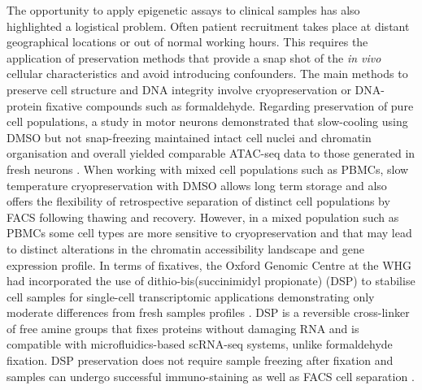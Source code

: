 The opportunity to apply epigenetic assays to clinical samples has also highlighted a logistical problem. Often patient recruitment takes place at distant geographical locations or out of normal working hours. This requires the application of preservation methods that provide a snap shot of the \textit{in vivo} cellular characteristics and avoid introducing confounders. The main methods to preserve cell structure and DNA integrity involve cryopreservation or DNA-protein fixative compounds such as formaldehyde. Regarding preservation of pure cell populations, a study in motor neurons demonstrated that slow-cooling using DMSO but not snap-freezing maintained intact cell nuclei and chromatin organisation and overall yielded comparable ATAC-seq data to those generated in fresh neurons \parencite{Milani2016}. When working with mixed cell populations such as PBMCs, slow temperature cryopreservation with DMSO allows long term storage and also offers the flexibility of retrospective separation of distinct cell populations by FACS following thawing and recovery. However, in a mixed population such as PBMCs some cell types are more sensitive to cryopreservation and that may lead to distinct alterations in the chromatin accessibility landscape and gene expression profile. In terms of fixatives, the Oxford Genomic Centre at the WHG had incorporated the use of dithio-bis(succinimidyl propionate) (DSP) to stabilise cell samples for single-cell transcriptomic applications demonstrating only moderate differences from fresh samples profiles \parencite{Attar2018}. DSP is a reversible cross-linker of free amine groups that fixes proteins without damaging RNA and is compatible with microfluidics-based scRNA-seq systems, unlike formaldehyde fixation. DSP preservation does not require sample freezing after fixation and samples can undergo successful immuno-staining as well as FACS cell separation \parencite{Espina2013}. %



